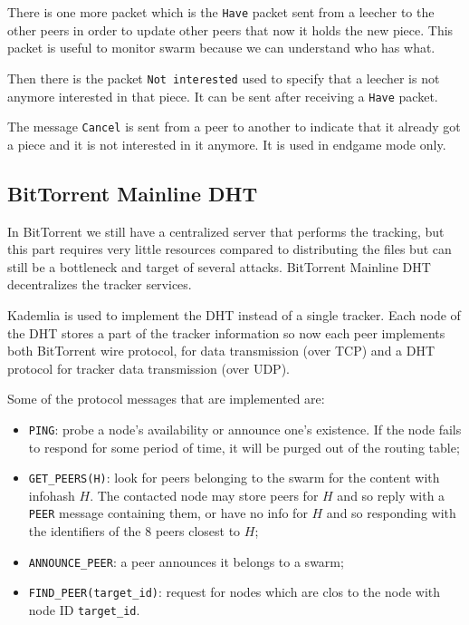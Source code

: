 There is one more packet which is the \verb|Have| packet sent from a leecher to the other peers in order to update other peers that now it holds the new piece.
This packet is useful to monitor swarm because we can understand who has what.

Then there is the packet \verb|Not interested| used to specify that a leecher is not anymore interested in that piece.
It can be sent after receiving a \verb|Have| packet.

The message \verb|Cancel| is sent from a peer to another to indicate that it already got a piece and it is not interested in it anymore.
It is used in endgame mode only.

\subsection{BitTorrent Mainline DHT}
In BitTorrent we still have a centralized server that performs the tracking, but this part requires very little resources compared to distributing the files but can still be a bottleneck and target of several attacks.
BitTorrent Mainline DHT decentralizes the tracker services.

Kademlia is used to implement the DHT instead of a single tracker.
Each node of the DHT stores a part of the tracker information so now each peer implements both BitTorrent wire protocol, for data transmission (over TCP) and a DHT protocol for tracker data transmission (over UDP).

Some of the protocol messages that are implemented are:
\begin{itemize}
    \item \verb|PING|: probe a node's availability or announce one's existence.
    If the node fails to respond for some period of time, it will be purged out of the routing table;

    \item \verb|GET_PEERS(H)|: look for peers belonging to the swarm for the content with infohash $H$.
    The contacted node may store peers for $H$ and so reply with a \verb|PEER| message containing them, or have no info for $H$ and so responding with the identifiers of the 8 peers closest to $H$;

    \item \verb|ANNOUNCE_PEER|: a peer announces it belongs to a swarm;

    \item \verb|FIND_PEER(target_id)|: request for nodes which are clos to the node with node ID \verb|target_id|.
\end{itemize}



